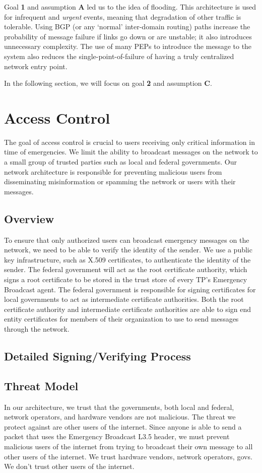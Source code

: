 Goal \textbf{1} and assumption \textbf{A} led us to the idea of flooding. This architecture is used for infrequent and \textit{urgent} events, meaning that degradation of other traffic is tolerable. Using BGP (or any `normal' inter-domain routing) paths increase the probability of message failure if links go down or are unstable; it also introduces unnecessary complexity. The use of many PEPs to introduce the message to the system also reduces the single-point-of-failure of having a truly centralized network entry point.

In the following section, we will focus on goal \textbf{2} and assumption \textbf{C}. 
\section{Access Control}\label{acl}
The goal of access control is crucial to users receiving only critical information in time of emergencies. We limit the ability to broadcast messages on the network to a small group of trusted parties such as local and federal governments. Our network architecture is responsible for preventing malicious users from disseminating misinformation or spamming the network or users with their messages.
\subsection{Overview}
To ensure that only authorized users can broadcast emergency messages on the network, we need to be able to verify the identity of the sender. We use a public key infrastructure, such as X.509 certificates\cite{x509}, to authenticate the identity of the sender. The federal government will act as the root certificate authority, which signs a root certificate to be stored in the trust store of every TP's Emergency Broadcast agent. The federal government is responsible for signing certificates for local governments to act as intermediate certificate authorities. Both the root certificate authority and intermediate certificate authorities are able to sign end entity certificates for members of their organization to use to send messages through the network.
\subsection{Detailed Signing/Verifying Process}
\subsection{Threat Model}
In our architecture, we trust that the governments, both local and federal, network operators, and hardware vendors are not malicious. The threat we protect against are other users of the internet. Since anyone is able to send a packet that uses the Emergency Broadcast L3.5 header, we must prevent malicious users of the internet from trying to broadcast their own message to all other users of the internet.
We trust hardware vendors, network operators, govs.
We don't trust other users of the internet.
